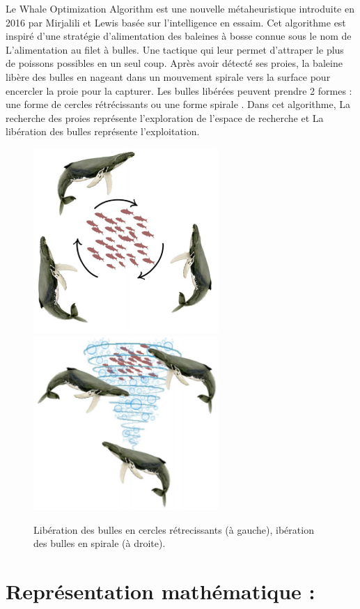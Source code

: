 \documentclass[12pt]{article}
\begin{document}
Le Whale Optimization Algorithm est une nouvelle métaheuristique introduite en 2016 par Mirjalili et Lewis basée sur l’intelligence en essaim. Cet algorithme est inspiré d’une stratégie d’alimentation des baleines à bosse connue sous le nom de L'alimentation au filet à bulles. Une tactique qui leur permet d’attraper le plus de poissons possibles en un seul coup. Après avoir détecté ses proies, la baleine libère des bulles en nageant dans un mouvement spirale vers la surface pour encercler la proie pour la capturer.
Les bulles libérées peuvent prendre 2 formes : une forme de cercles rétrécissants ou une forme spirale . 
Dans cet algorithme, La recherche des proies représente l’exploration de l’espace de recherche et La libération des bulles représente l’exploitation.
\begin{figure}[hbt!] 
    \includegraphics[width=7cm]{../figures/WOA/cercles.png}
    \includegraphics[width=7cm]{../figures/WOA/spiral.png}
    \caption{Libération des bulles en cercles rétrecissants (à gauche), ibération des bulles en spirale (à droite).}
\end{figure}
\section{Représentation mathématique :}
\end{document}

